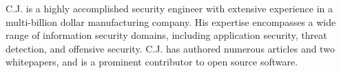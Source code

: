 C.J. is a highly accomplished security engineer with extensive experience in a multi-billion dollar manufacturing company. His expertise encompasses a wide range of information security domains, including application security, threat detection, and offensive security. C.J. has authored numerous articles and two whitepapers, and is a prominent contributor to open source software.